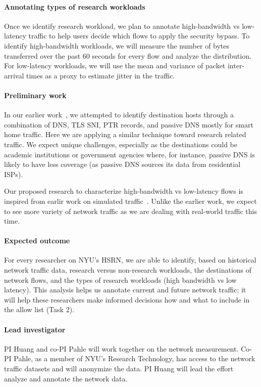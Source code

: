 \paragraph{Annotating types of research workloads}
Once we identify research workload, we plan to annotate high-bandwidth vs low-latency traffic to help users decide which flows to apply the security bypass. To identify high-bandwidth workloads, we will measure the number of bytes transferred over the past 60 seconds for every flow and analyze the distribution. For low-latency workloads, we will use the mean and variance of packet inter-arrival times as a proxy to estimate jitter in the traffic.


\paragraph{Preliminary work}
In our earlier work~\cite{huang2020iot}, we attempted to identify destination hosts through a combination of DNS, TLS SNI, PTR records, and passive DNS mostly for smart home traffic. Here we are applying a similar technique toward research related traffic. We expect unique challenges, especially as the destinations could be academic institutions or government agencies where, for instance, passive DNS is likely to have less coverage (as passive DNS sources its data from residential ISPs).

Our proposed research to characterize high-bandwidth vs low-latency flows is inspired from earlir work on simulated traffic~\cite{huang2013high}. Unlike the earlier work, we expect to see more variety of network traffic as we are dealing with real-world traffic this time.


\paragraph{Expected outcome}
For every researcher on NYU's HSRN, we are able to identify, based on historical network traffic data, research versus non-research workloads, the destinations of network flows, and the types of research workloads (high bandwidth vs low latency). This analysis helps us annotate current and future network traffic; it will help these researchers make informed decisions how and what to include in the allow list (Task 2).

\paragraph{Lead investigator} PI Huang and co-PI Pahle will work together on the network measurement. Co-PI Pahle, as a member of NYU's Research Technology, has access to the network traffic datasets and will anonymize the data. PI Huang will lead the effort analyze and annotate the network data.
